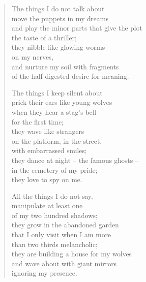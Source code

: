 \begin{verse}
The things I do not talk about\\
move the puppets in my dreams\\
and play the minor parts that give the plot\\
the taste of a thriller;\\
they nibble like glowing worms\\
on my nerves,\\
and nurture my soil with fragments\\
of the half-digested desire for meaning.

The things I keep silent about\\
prick their ears like young wolves\\
when they hear a stag's bell\\
for the first time;\\
they wave like strangers\\
on the platform, in the street,\\
with embarrassed smiles;\\
they dance at night -- the famous ghosts --\\
in the cemetery of my pride;\\
they love to spy on me.

All the things I do not say,\\
manipulate at least one\\
of my two hundred shadows;\\
they grow in the abandoned garden\\
that I only visit when I am more\\
than two thirds melancholic;\\
they are building a house for my wolves\\
and wave about with giant mirrors\\
ignoring my presence.
\end{verse}

